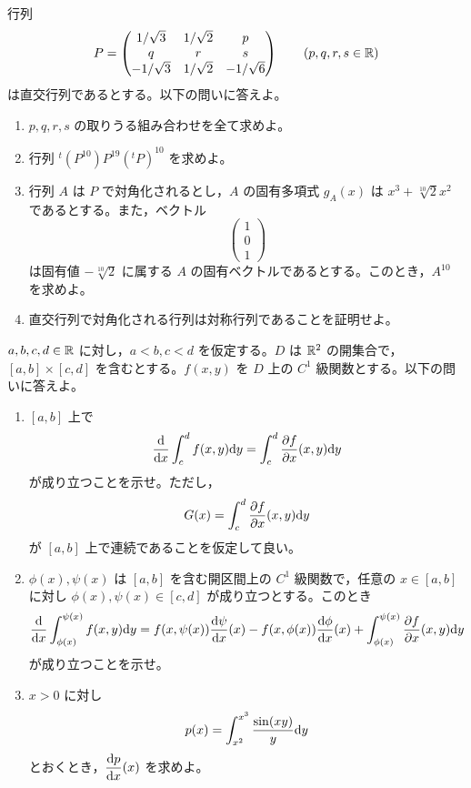 行列
\[
P=\begin{pmatrix}
1/\sqrt3&1/\sqrt2&p\\
q&r&s\\
-1/\sqrt3&1/\sqrt2&-1/\sqrt6
\end{pmatrix}
\qquad(p,q,r,s\in\mathbb{R})
\]
は直交行列であるとする。以下の問いに答えよ。
\begin{enumerate}
  \item[(問1)] $p,q,r,s$ の取りうる組み合わせを全て求めよ。
  \item[(問2)] 行列 ${}^{t}(P^{10})P^{19}({}^{t}P)^{10}$ を求めよ。
  \item[(問3)] 行列 $A$ は $P$ で対角化されるとし，$A$ の固有多項式 $g_A(x)$ は $x^3+\sqrt[10]{2}x^2$ であるとする。また，ベクトル
  \[
  \begin{pmatrix}1\\0\\1\end{pmatrix}
  \]
  は固有値 $-\sqrt[10]{2}$ に属する $A$ の固有ベクトルであるとする。このとき，$A^{10}$ を求めよ。
  \item[(問4)] 直交行列で対角化される行列は対称行列であることを証明せよ。
\end{enumerate}
\wbend

$a,b,c,d\in\mathbb{R}$ に対し，$a<b,c<d$ を仮定する。$D$ は $\mathbb{R}^2$ の開集合で，$[a,b]\times[c,d]$ を含むとする。$f(x,y)$ を $D$ 上の $C^1$ 級関数とする。以下の問いに答えよ。
\begin{enumerate}
  \item[(問1)] $[a,b]$ 上で
  \[
  \frac{\mathrm{d}}{\mathrm{d} x}\int_c^d f(x,y)\mathrm{d} y
  =\int_c^d\frac{\partial f}{\partial x}(x,y)\mathrm{d} y
  \]
  が成り立つことを示せ。ただし，
  \[
  G(x)=\int_c^d\frac{\partial f}{\partial x}(x,y)\mathrm{d} y
  \]
  が $[a,b]$ 上で連続であることを仮定して良い。
  \item[(問2)] $\phi(x),\psi(x)$ は $[a,b]$ を含む開区間上の $C^1$ 級関数で，任意の $x\in[a,b]$ に対し $\phi(x),\psi(x)\in[c,d]$ が成り立つとする。このとき
  \[
  \frac{\mathrm{d}}{\mathrm{d} x}\int_{\phi(x)}^{\psi(x)}f(x,y)\mathrm{d} y
  =f(x,\psi(x))\frac{\mathrm{d}\psi}{\mathrm{d} x}(x)
  -f(x,\phi(x))\frac{\mathrm{d}\phi}{\mathrm{d} x}(x)
  +\int_{\phi(x)}^{\psi(x)}\frac{\partial f}{\partial x}(x,y)\mathrm{d} y
  \]
  が成り立つことを示せ。
  \item[(問3)] $x>0$ に対し
  \[
  p(x)=\int_{x^2}^{x^3}\frac{\sin(xy)}{y}\mathrm{d} y
  \]
  とおくとき，$\displaystyle\frac{\mathrm{d} p}{\mathrm{d} x}(x)$ を求めよ。
\end{enumerate}
\wbend


